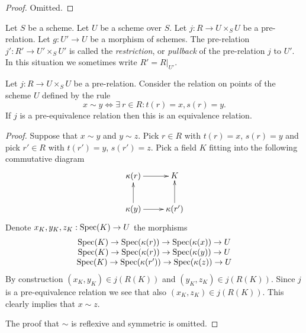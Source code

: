 \begin{proof}
Omitted.
\end{proof}

\begin{definition}
\label{definition-restrict-relation}
Let $S$ be a scheme.
Let $U$ be a scheme over $S$.
Let $j : R \to U \times_S U$ be a pre-relation.
Let $g : U' \to U$ be a morphism of schemes.
The pre-relation $j' : R' \to U' \times_S U'$ is called
the {\it restriction}, or {\it pullback} of the pre-relation $j$ to $U'$.
In this situation we sometimes write $R' = R|_{U'}$.
\end{definition}

\begin{lemma}
\label{lemma-pre-equivalence-equivalence-relation-points}
Let $j : R \to U \times_S U$ be a pre-relation.
Consider the relation on points of the scheme $U$ defined by
the rule
$$
x \sim y
\Leftrightarrow
\exists\ r \in R :
t(r) = x,
s(r) = y.
$$
If $j$ is a pre-equivalence relation then this is an
equivalence relation.
\end{lemma}

\begin{proof}
Suppose that $x \sim y$ and $y \sim z$.
Pick $r \in R$ with $t(r) = x$, $s(r) = y$ and
pick $r' \in R$ with $t(r') = y$, $s(r') = z$.
Pick a field $K$ fitting into the following commutative
diagram
$$
\xymatrix{
\kappa(r) \ar[r] & K \\
\kappa(y) \ar[u] \ar[r] & \kappa(r') \ar[u]
}
$$
Denote $x_K, y_K, z_K : \mathop{\mathrm{Spec}}(K) \to U$
the morphisms
$$
\begin{matrix}
\mathop{\mathrm{Spec}}(K) \to \mathop{\mathrm{Spec}}(\kappa(r))
\to
\mathop{\mathrm{Spec}}(\kappa(x)) \to U \\
\mathop{\mathrm{Spec}}(K) \to \mathop{\mathrm{Spec}}(\kappa(r))
\to
\mathop{\mathrm{Spec}}(\kappa(y)) \to U \\
\mathop{\mathrm{Spec}}(K) \to \mathop{\mathrm{Spec}}(\kappa(r'))
\to
\mathop{\mathrm{Spec}}(\kappa(z)) \to U
\end{matrix}
$$
By construction $(x_K, y_K) \in j(R(K))$ and
$(y_K, z_K) \in j(R(K))$. Since $j$ is a pre-equivalence relation
we see that also $(x_K, z_K) \in j(R(K))$.
This clearly implies that $x \sim z$.

\medskip\noindent
The proof that $\sim$ is reflexive and symmetric is omitted.
\end{proof}


